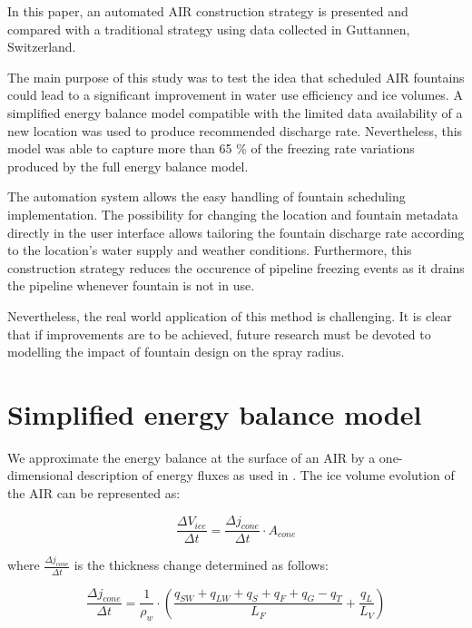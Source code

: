 \documentclass[tc, manuscript]{copernicus}
\begin{document}
\conclusions
In this paper, an automated AIR construction strategy is presented and compared with a traditional strategy
using data collected in Guttannen, Switzerland.

The main purpose of this study was to test the idea that scheduled AIR fountains could lead to a significant
improvement in water use efficiency and ice volumes. A simplified energy balance model compatible with the
limited data availability of a new location was used to produce recommended discharge rate. Nevertheless, this
model was able to capture more than 65 \% of the freezing rate variations produced by the full energy balance
model.

The automation system allows the easy handling of fountain scheduling implementation. The possibility for
changing the location and fountain metadata directly in the user interface allows tailoring the fountain discharge rate
according to the location's water supply and weather conditions. Furthermore, this construction strategy reduces
the occurence of pipeline freezing events as it drains the pipeline whenever fountain is not in use.

Nevertheless, the real world application of this method is challenging. It is clear that if improvements are to
be achieved, future research must be devoted to modelling the impact of fountain design on the spray radius.

\appendix

\section{Simplified energy balance model}

We approximate the energy balance at the surface of an AIR by a one-dimensional description of energy fluxes as
used in \cite{balasubramanianInfluenceMeteorologicalConditions2022}. The ice volume evolution of the AIR can be
represented as: 

\begin{equation}
  \frac{\Delta V_{ice}}{\Delta t}  =  \frac{\Delta j_{cone}}{ \Delta t} \cdot A_{cone}
	\label{eqn:freeze}
\end{equation}

where $\frac{\Delta j_{cone}}{\Delta t}$ is the thickness change determined as follows:

\begin{equation}
  \frac{\Delta j_{cone}}{\Delta t}  = \frac{1}{\rho_w} \cdot (\frac{q_{SW} + q_{LW} + q_{S} + q_{F} + q_{G} -
  q_{T}}{L_F} + \frac{q_{L}}{L_V} )
	\label{eqn:freeze}
\end{equation}
\end{document}
